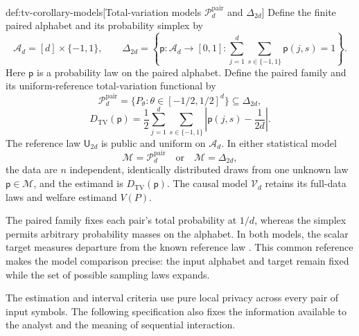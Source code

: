 \documentclass[11pt]{article}
\begin{document}
\begin{definitionv}{def:tv-corollary-models}[Total-variation models $\mathcal P_d^{\mathrm{pair}}$ and $\Delta_{2d}$]
Define the finite paired alphabet and its probability simplex by
\[
\mathcal A_d=[d]\times\{-1,1\},
\qquad
\Delta_{2d}
=
\left\{
\mathsf p:\mathcal A_d\to[0,1]:
\sum_{j=1}^d\sum_{s\in\{-1,1\}}\mathsf p(j,s)=1
\right\}.
\]
Here \(\mathsf p\) is a probability law on the paired alphabet. Define the paired family and its uniform-reference total-variation functional by
\[
\mathcal P_d^{\mathrm{pair}}
=
\{P_\theta:\theta\in[-1/2,1/2]^d\}
\subseteq\Delta_{2d},
\]
\[
D_{\mathrm{TV}}(\mathsf p)
=
\frac12\sum_{j=1}^d\sum_{s\in\{-1,1\}}
\left|\mathsf p(j,s)-\frac1{2d}\right|.
\]
The reference law \(\mathsf U_{2d}\) is public and uniform on \(\mathcal A_d\). In either statistical model
\[
\mathcal M=\mathcal P_d^{\mathrm{pair}}
\quad\text{or}\quad
\mathcal M=\Delta_{2d},
\]
the data are \(n\) independent, identically distributed draws from one unknown law \(\mathsf p\in\mathcal M\), and the estimand is \(D_{\mathrm{TV}}(\mathsf p)\). The causal model \(\mathcal V_d\) retains its full-data laws and welfare estimand \(V(P)\).
\end{definitionv}

The paired family  fixes each pair's total probability at \(1/d\), whereas the simplex  permits arbitrary probability masses on the alphabet. In both models, the scalar target  measures departure from the known reference law . This common reference makes the model comparison precise: the input alphabet and target remain fixed while the set of possible sampling laws expands.

The estimation and interval criteria use pure local privacy across every pair of input symbols. The following specification also fixes the information available to the analyst and the meaning of sequential interaction.
\end{document}
